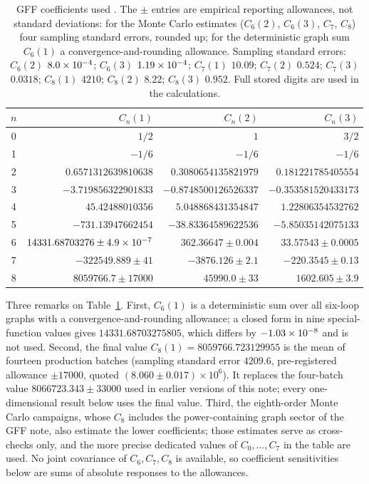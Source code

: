 \begin{table}[htbp]\centering\small
\begin{tabular}{@{}c r r r@{}}
\toprule
$n$ & $C_n(1)$ & $C_n(2)$ & $C_n(3)$\\ \midrule
0 & $1/2$ & $1$ & $3/2$\\
1 & $-1/6$ & $-1/6$ & $-1/6$\\
2 & $0.6571312639810638$ & $0.3080654135821979$ & $0.181221785405554$\\
3 & $-3.719856322901833$ & $-0.8748500126526337$ & $-0.353581520433173$\\
4 & $45.42488010356$ & $5.048868431354847$ & $1.22806354532762$\\
5 & $-731.13947662454$ & $-38.83364589622536$ & $-5.85035142075133$\\
6 & $14331.68703276\pm4.9\times10^{-7}$ & $362.36647\pm0.004$ & $33.57543\pm0.0005$\\
7 & $-322549.889\pm41$ & $-3876.126\pm2.1$ & $-220.3545\pm0.13$\\
8 & $8059766.7\pm17000$ & $45990.0\pm33$ & $1602.605\pm3.9$\\
\bottomrule
\end{tabular}
\caption{GFF coefficients used \cite{rs:noteGFF}. The $\pm$ entries are empirical reporting
allowances, not standard deviations: for the Monte Carlo estimates ($C_6(2)$, $C_6(3)$, $C_7$,
$C_8$) four sampling standard errors, rounded up; for the deterministic graph sum $C_6(1)$ a
convergence-and-rounding allowance. Sampling standard errors: $C_6(2)$ $8.0\times10^{-4}$;
$C_6(3)$ $1.19\times10^{-4}$; $C_7(1)$ $10.09$; $C_7(2)$ $0.524$; $C_7(3)$ $0.0318$; $C_8(1)$
$4210$; $C_8(2)$ $8.22$; $C_8(3)$ $0.952$. Full stored digits are used in the calculations.}
\label{rs:tab:coefficients}
\end{table}

Three remarks on Table~\ref{rs:tab:coefficients}. First, $C_6(1)$ is a deterministic sum
over all six-loop graphs with a convergence-and-rounding allowance; a closed form in nine
special-function values gives $14331.68703275805$, which differs by $-1.03\times10^{-8}$ and
is not used. Second, the final value $C_8(1)=8059766.723129955$ is the mean of fourteen
production batches (sampling standard error $4209.6$, pre-registered allowance
$\pm17000$, quoted $(8.060\pm0.017)\times10^6$). It replaces the four-batch value
$8066723.343\pm33000$ used in earlier versions of this note; every one-dimensional result below uses
the final value. Third, the eighth-order Monte Carlo campaigns, whose $C_8$ includes the
power-containing graph sector of the GFF note, also estimate the lower coefficients; those
estimates serve as cross-checks only, and the more precise dedicated values of
$C_0,\dots,C_7$ in the table are used. No joint covariance of
$C_6,C_7,C_8$ is available, so coefficient sensitivities below are sums of absolute
responses to the allowances.

